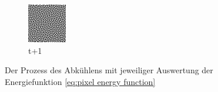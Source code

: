 \begin{figure}[H]
\begin{tcolorbox}[boxrule=4pt,sharp corners=downhill,title=Abkühlen]
\begin{subfigure}[b]{0.2\linewidth}
        \includegraphics[width=\linewidth]{content/simulatedAnnealing/Bilder/next_dither_LDR_RGBA_0_64_r_channel.png}
        \caption{ t+1}
        \label{pic:dither1}
    \end{subfigure}
    \end{tcolorbox}
    \caption{Der Prozess des Abkühlens mit jeweiliger Auswertung der Energiefunktion \ref{eq:pixel energy function}}
    \label{fig:annelaing animated}
\end{figure}

